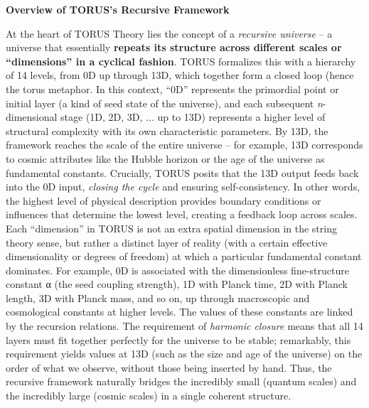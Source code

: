 \textbf{Overview of TORUS's Recursive Framework}

At the heart of TORUS Theory lies the concept of a \emph{recursive
universe} -- a universe that essentially \textbf{repeats its structure
across different scales or ``dimensions'' in a cyclical fashion}. TORUS
formalizes this with a hierarchy of 14 levels, from 0D up through 13D,
which together form a closed loop (hence the torus metaphor. In this
context, ``0D'' represents the primordial point or initial layer (a kind
of seed state of the universe), and each subsequent \emph{n}-dimensional
stage (1D, 2D, 3D, ... up to 13D) represents a higher level of
structural complexity with its own characteristic parameters. By 13D,
the framework reaches the scale of the entire universe -- for example,
13D corresponds to cosmic attributes like the Hubble horizon or the age
of the universe as fundamental constants​. Crucially, TORUS posits that
the 13D output feeds back into the 0D input, \emph{closing the cycle}
and ensuring self-consistency​. In other words, the highest level of
physical description provides boundary conditions or influences that
determine the lowest level, creating a feedback loop across scales. Each
``dimension'' in TORUS is not an extra spatial dimension in the string
theory sense, but rather a distinct layer of reality (with a certain
effective dimensionality or degrees of freedom) at which a particular
fundamental constant dominates. For example, 0D is associated with the
dimensionless fine-structure constant α (the seed coupling strength), 1D
with Planck time, 2D with Planck length, 3D with Planck mass, and so on,
up through macroscopic and cosmological constants at higher levels​. The
values of these constants are linked by the recursion relations. The
requirement of \emph{harmonic closure} means that all 14 layers must fit
together perfectly for the universe to be stable; remarkably, this
requirement yields values at 13D (such as the size and age of the
universe) on the order of what we observe, without those being inserted
by hand​. Thus, the recursive framework naturally bridges the incredibly
small (quantum scales) and the incredibly large (cosmic scales) in a
single coherent structure.


